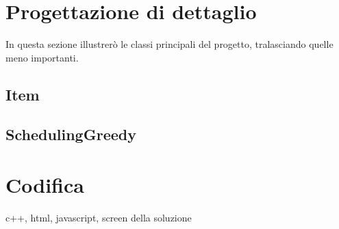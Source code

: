 \section{Progettazione di dettaglio}
In questa sezione illustrerò le classi principali del progetto, tralasciando
quelle meno importanti.
\subsection{Item}
\subsection{SchedulingGreedy}
\section{Codifica}
c++, html, javascript, screen della soluzione